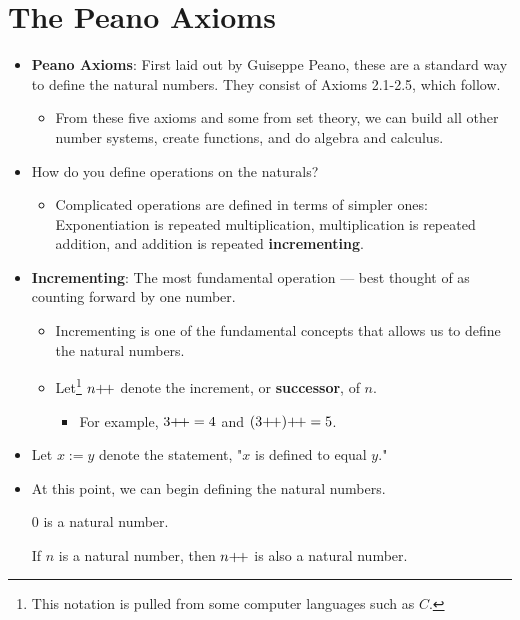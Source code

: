 \documentclass[../main.tex]{subfiles}
\begin{document}
\section{The Peano Axioms}\label{sse:2.1}
\begin{itemize}
    \item \textbf{Peano Axioms}: First laid out by Guiseppe Peano, these are a standard way to define the natural numbers. They consist of Axioms 2.1-2.5, which follow.
    \begin{itemize}
        \item From these five axioms and some from set theory, we can build all other number systems, create functions, and do algebra and calculus.
    \end{itemize}
    \item How do you define operations on the naturals?
    \begin{itemize}
        \item Complicated operations are defined in terms of simpler ones: Exponentiation is repeated multiplication, multiplication is repeated addition, and addition is repeated \textbf{incrementing}.
    \end{itemize}
    \item \textbf{Incrementing}: The most fundamental operation --- best thought of as counting forward by one number.
    \begin{itemize}
        \item Incrementing is one of the fundamental concepts that allows us to define the natural numbers.
        \item Let\footnote{This notation is pulled from some computer languages such as $C$.} $n{+\!+}$ denote the increment, or \textbf{successor}, of $n$.
        \begin{itemize}
            \item For example, $3{+\!+}=4$ and $(3{+\!+}){+\!+}=5$.
        \end{itemize}
    \end{itemize}
    \item Let $x:=y$ denote the statement, "$x$ is defined to equal $y$."
    \item At this point, we can begin defining the natural numbers.
    \begin{axm}\label{axm:0inN}
        0 is a natural number.
    \end{axm}
    \begin{axm}\label{axm:npplus}
        If $n$ is a natural number, then $n{+\!+}$ is also a natural number.

\end{axm}
\end{itemize}
\end{document}
